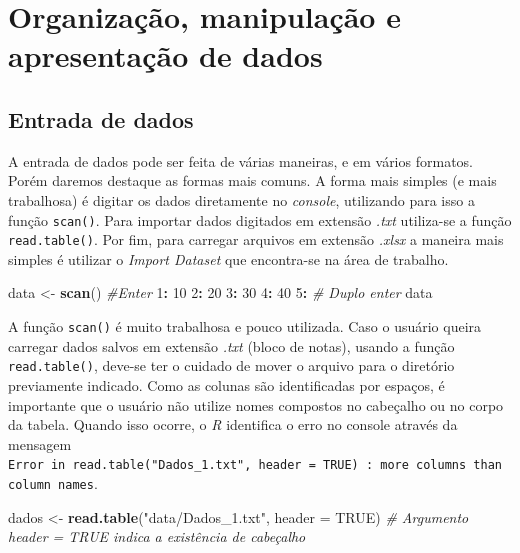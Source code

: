 \documentclass[
]{book}
\makeatletter
\newenvironment{Shaded}{\begin{snugshade}}{\end{snugshade}}
\newcommand{\CommentTok}[1]{\textcolor[rgb]{0.56,0.35,0.01}{\textit{#1}}}
\newcommand{\DataTypeTok}[1]{\textcolor[rgb]{0.13,0.29,0.53}{#1}}
\newcommand{\DecValTok}[1]{\textcolor[rgb]{0.00,0.00,0.81}{#1}}
\newcommand{\KeywordTok}[1]{\textcolor[rgb]{0.13,0.29,0.53}{\textbf{#1}}}
\newcommand{\NormalTok}[1]{#1}
\newcommand{\OperatorTok}[1]{\textcolor[rgb]{0.81,0.36,0.00}{\textbf{#1}}}
\newcommand{\OtherTok}[1]{\textcolor[rgb]{0.56,0.35,0.01}{#1}}
\newcommand{\StringTok}[1]{\textcolor[rgb]{0.31,0.60,0.02}{#1}}
\numberwithin{equation}{section}
\newcommand{\indf}[1]{\index[function]{#1@\texttt{#1()}|ST}}
\newcommand{\indt}[1]{\index{#1|ST}}
\makeatother
\begin{document}
\hypertarget{part-organizauxe7uxe3o-manipulauxe7uxe3o-e-apresentauxe7uxe3o-de-dados}{%
\part{Organização, manipulação e apresentação de dados}\label{part-organizauxe7uxe3o-manipulauxe7uxe3o-e-apresentauxe7uxe3o-de-dados}}

\hypertarget{entrada}{%
\chapter{Entrada de dados}\label{entrada}}

A entrada de dados pode ser feita de várias maneiras, e em vários formatos. Porém daremos destaque as formas mais comuns. A forma mais simples (e mais trabalhosa) é digitar os dados diretamente no \emph{console}, utilizando para isso a função \texttt{scan()}. \indf{scan} Para importar dados digitados em extensão \emph{.txt} utiliza-se a função \texttt{read.table()}. \indt{read.table} Por fim, para carregar arquivos em extensão \emph{.xlsx} a maneira mais simples é utilizar o \emph{Import Dataset} que encontra-se na área de trabalho.

\begin{Shaded}
\begin{Highlighting}[]
\NormalTok{data \textless{}{-}}\StringTok{ }\KeywordTok{scan}\NormalTok{() }\CommentTok{\#Enter}
\DecValTok{1}\OperatorTok{:}\StringTok{ }\DecValTok{10}
\DecValTok{2}\OperatorTok{:}\StringTok{ }\DecValTok{20}
\DecValTok{3}\OperatorTok{:}\StringTok{ }\DecValTok{30}
\DecValTok{4}\OperatorTok{:}\StringTok{ }\DecValTok{40}
\DecValTok{5}\OperatorTok{:}\StringTok{ }\CommentTok{\# Duplo enter}
\NormalTok{data}
\end{Highlighting}
\end{Shaded}

A função \texttt{scan()} é muito trabalhosa e pouco utilizada. Caso o usuário queira carregar dados salvos em extensão \emph{.txt} (bloco de notas), usando a função \texttt{read.table()}, deve-se ter o cuidado de mover o arquivo para o diretório previamente indicado. Como as colunas são identificadas por espaços, é importante que o usuário não utilize nomes compostos no cabeçalho ou no corpo da tabela. Quando isso ocorre, o \emph{R} identifica o erro no console através da mensagem \texttt{Error\ in\ read.table("Dados\_1.txt",\ header\ =\ TRUE)\ :\ more\ columns\ than\ column\ names}.

\begin{Shaded}
\begin{Highlighting}[]
\NormalTok{dados \textless{}{-}}\StringTok{ }\KeywordTok{read.table}\NormalTok{(}\StringTok{"data/Dados\_1.txt"}\NormalTok{, }\DataTypeTok{header =} \OtherTok{TRUE}\NormalTok{)}
\CommentTok{\# Argumento header = TRUE indica a existência de cabeçalho}
\end{Highlighting}
\end{Shaded}
\end{document}
